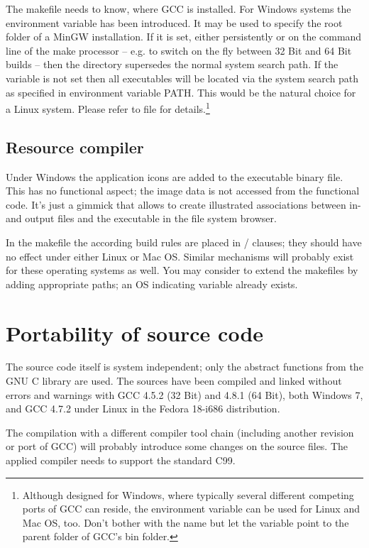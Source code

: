 The makefile needs to know, where GCC is installed. For Windows systems
the environment variable  has been introduced. It may
be used to specify the root folder of a MinGW installation. If it is set,
either persistently or on the command line of the make processor -- e.g.
to switch on the fly between 32 Bit and 64 Bit builds -- then the
directory  supersedes the normal system
search path. If the variable is not set then all executables will be
located via the system search path as specified in environment variable
PATH. This would be the natural choice for a Linux system. Please refer to
file  for details.\footnote{Although designed for
Windows, where typically several different competing ports of GCC can
reside, the environment variable can be used for Linux and Mac OS, too.
Don't bother with the name but let the variable point to the parent folder
of GCC's bin folder.}


\subsection{Resource compiler}

Under Windows the application icons are added to the executable binary
file. This has no functional aspect; the image data is not accessed from
the functional code. It's just a gimmick that allows to create illustrated
associations between \linnet{} in- and output files and the executable in
the file system browser.

In the makefile the according build rules are placed in
/ clauses; they should have no effect under either
Linux or Mac OS. Similar mechanisms will probably exist for these operating
systems as well. You may consider to extend the makefiles by adding
appropriate  paths; an OS indicating variable already exists.


\section{Portability of source code}

The source code itself is system independent; only the abstract functions
from the GNU C library are used. The sources have been compiled and linked
without errors and warnings with GCC 4.5.2 (32 Bit) and 4.8.1 (64 Bit),
both Windows 7, and GCC 4.7.2 under Linux in the Fedora 18-i686
distribution.

The compilation with a different compiler tool chain (including another
revision or port of GCC) will probably introduce some changes on the
source files. The applied compiler needs to support the standard C99.


